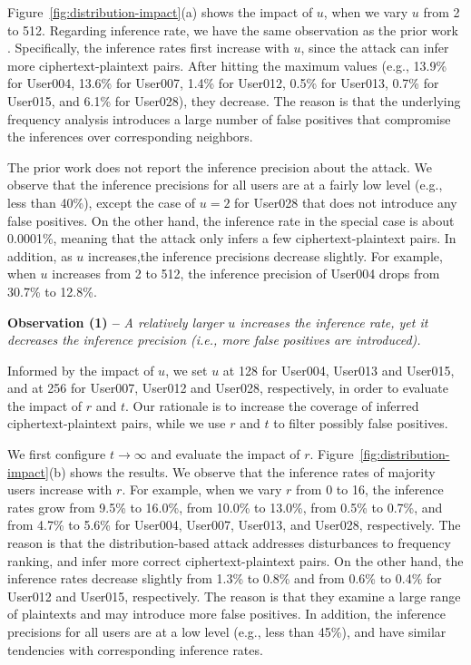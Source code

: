 Figure~\ref{fig:distribution-impact}(a) shows the impact of $u$, when we vary $u$ from 2 to 512. Regarding inference rate, we have the same observation as the prior work \cite{li17}. Specifically, the inference rates first increase with $u$, since the attack can infer more ciphertext-plaintext pairs. After hitting the maximum values (e.g., 13.9\% for User004, 13.6\% for User007, 1.4\% for User012, 0.5\% for User013, 0.7\% for User015, and 6.1\% for User028), they decrease.  The reason is that the underlying frequency analysis introduces a large number of false positives that compromise the inferences over corresponding neighbors.    

The prior work \cite{li17} does not report the inference precision about the attack. We observe that the inference precisions for all users are at a fairly low level (e.g., less than 40\%), except the case of $u = 2$ for User028 that does not introduce any false positives. On the other hand, the inference rate in the special case is about 0.0001\%, meaning that the attack only infers a few ciphertext-plaintext pairs. In addition, as $u$ increases,the inference precisions decrease slightly. For example, when $u$ increases from 2 to 512, the inference precision of User004 drops from 30.7\% to 12.8\%.      

{\bf Observation (1) --} {\em A relatively larger $u$ increases the inference rate, yet it decreases the inference precision (i.e., more false positives are introduced). }

Informed by the impact of $u$, we set $u$ at 128 for User004, User013 and User015, and at 256 for User007, User012 and User028, respectively, in order to evaluate the impact of $r$ and $t$.  Our rationale is to increase the coverage of inferred ciphertext-plaintext pairs, while we use $r$ and $t$ to filter possibly false positives. 

We first configure $t \rightarrow \infty$ and evaluate the impact of $r$. Figure~\ref{fig:distribution-impact}(b) shows the results. We observe that the inference rates of majority users increase with $r$. For example, when we vary $r$ from 0 to 16, the inference rates grow from 9.5\% to 16.0\%, from 10.0\% to 13.0\%, from 0.5\% to 0.7\%, and from 4.7\% to 5.6\% for User004, User007, User013, and User028, respectively. The reason is that the distribution-based attack addresses disturbances to frequency ranking, and infer more correct ciphertext-plaintext  pairs. On the other hand, the inference rates decrease slightly from 1.3\% to 0.8\% and from 0.6\% to 0.4\% for User012 and User015, respectively. The reason is that they examine a large range of plaintexts and may introduce more false positives. In addition, the inference precisions for all users are  at a low level (e.g., less than 45\%), and have similar tendencies with corresponding inference rates.  

